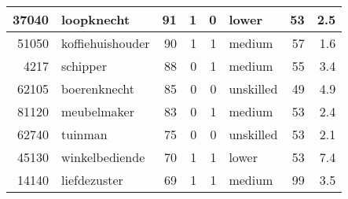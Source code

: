\begin{table}
\begin{tabular}[t]{r|l|r|r|r|l|r|r}
\hline
37040 & loopknecht & 91 & 1 & 0 & lower & 53 & 2.5\\
\hline
51050 & koffiehuishouder & 90 & 1 & 1 & medium & 57 & 1.6\\
\hline
4217 & schipper & 88 & 0 & 1 & medium & 55 & 3.4\\
\hline
62105 & boerenknecht & 85 & 0 & 0 & unskilled & 49 & 4.9\\
\hline
81120 & meubelmaker & 83 & 0 & 1 & medium & 53 & 2.4\\
\hline
62740 & tuinman & 75 & 0 & 0 & unskilled & 53 & 2.1\\
\hline
45130 & winkelbediende & 70 & 1 & 1 & lower & 53 & 7.4\\
\hline
14140 & liefdezuster & 69 & 1 & 1 & medium & 99 & 3.5\\
\hline
\end{tabular}
\end{table}

